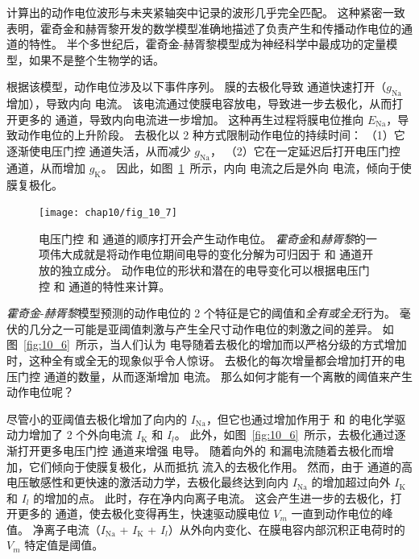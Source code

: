 计算出的动作电位波形与未夹紧轴突中记录的波形几乎完全匹配。
这种紧密一致表明，霍奇金和赫胥黎开发的数学模型准确地描述了负责产生和传播动作电位的通道的特性。
半个多世纪后，霍奇金-赫胥黎模型成为神经科学中最成功的定量模型，如果不是整个生物学的话。


根据该模型，动作电位涉及以下事件序列。
膜的去极化导致  通道快速打开（$g_\text{Na}$ 增加），导致内向  电流。
该电流通过使膜电容放电，导致进一步去极化，从而打开更多的  通道，导致内向电流进一步增加。 
这种再生过程将膜电位推向 $E_{\text{Na}}$，导致动作电位的上升阶段。
去极化以 2 种方式限制动作电位的持续时间：
（1）它逐渐使电压门控  通道失活，从而减少 $g_\text{Na}$，
（2）它在一定延迟后打开电压门控  通道，从而增加 $g_\text{K}$。
因此，如图~\ref{fig:10_7}~所示，内向  电流之后是外向  电流，倾向于使膜复极化。


\begin{figure}[htbp]
	\centering
	\texttt{[image: chap10/fig\_10\_7]}
	\caption{电压门控  和  通道的顺序打开会产生动作电位。
		\textit{霍奇金}和\textit{赫胥黎}的一项伟大成就是将动作电位期间电导的变化分解为可归因于  和  通道开放的独立成分。
		动作电位的形状和潜在的电导变化可以根据电压门控  和  通道的特性来计算\cite{hille1978ionic}。}
	\label{fig:10_7}
\end{figure}


\textit{霍奇金}-\textit{赫胥黎}模型预测的动作电位的 2 个特征是它的阈值和\textit{全有或全无}行为。
毫伏的几分之一可能是亚阈值刺激与产生全尺寸动作电位的刺激之间的差异。
如图~\ref{fig:10_6}~所示，当人们认为  电导随着去极化的增加而以严格分级的方式增加时，这种全有或全无的现象似乎令人惊讶。 
去极化的每次增量都会增加打开的电压门控  通道的数量，从而逐渐增加  电流。
那么如何才能有一个离散的阈值来产生动作电位呢？


尽管小的亚阈值去极化增加了向内的 $I_\text{Na}$，但它也通过增加作用于  和  的电化学驱动力增加了 2 个外向电流 $I_\text{K}$ 和 $I_l$。
此外，如图~\ref{fig:10_6}~所示，去极化通过逐渐打开更多电压门控  通道来增强  电导。
随着向外的  和漏电流随着去极化而增加，它们倾向于使膜复极化，从而抵抗  流入的去极化作用。
然而，由于  通道的高电压敏感性和更快速的激活动力学，去极化最终达到向内 $I_\text{Na}$ 的增加超过向外 $I_\text{K}$ 和 $I_l$ 的增加的点。
此时，存在净内向离子电流。
这会产生进一步的去极化，打开更多的  通道，使去极化变得再生，快速驱动膜电位 $V_m$ 一直到动作电位的峰值。
净离子电流（$I_\text{Na}$ + $I_\text{K}$ + $I_l$）从外向内变化、在膜电容内部沉积正电荷时的 $V_m$ 特定值是阈值。


